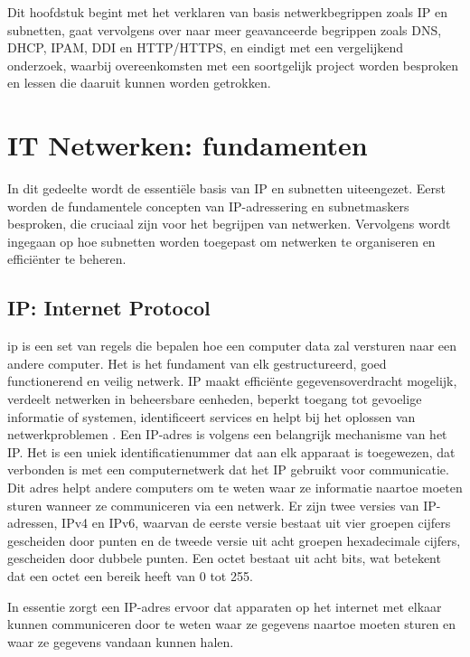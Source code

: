 Dit hoofdstuk begint met het verklaren van basis netwerkbegrippen zoals IP en subnetten, gaat vervolgens over naar meer geavanceerde begrippen zoals DNS, DHCP, IPAM, DDI en HTTP/HTTPS, en eindigt met een vergelijkend onderzoek, waarbij overeenkomsten met een soortgelijk project worden besproken en lessen die daaruit kunnen worden getrokken.


\section{IT Netwerken: fundamenten}
In dit gedeelte wordt de essentiële basis van IP en subnetten uiteengezet. Eerst worden de fundamentele concepten van IP-adressering en subnetmaskers besproken, die cruciaal zijn voor het begrijpen van netwerken. Vervolgens wordt ingegaan op hoe subnetten worden toegepast om netwerken te organiseren en efficiënter te beheren.

\subsection{IP: Internet Protocol}
\acrfull{ip} is een set van regels die bepalen hoe een computer data zal versturen naar een andere computer. Het is het fundament van elk gestructureerd, goed functionerend en veilig netwerk. IP maakt efficiënte gegevensoverdracht mogelijk, verdeelt netwerken in beheersbare eenheden, beperkt toegang tot gevoelige informatie of systemen, identificeert services en helpt bij het oplossen van netwerkproblemen \autocite{Postel1981}. Een IP-adres is volgens \textcite{Postel1981} een belangrijk mechanisme van het IP. Het is een uniek identificatienummer dat aan elk apparaat is toegewezen, dat verbonden is met een computernetwerk dat het IP gebruikt voor communicatie. Dit adres helpt andere computers om te weten waar ze informatie naartoe moeten sturen wanneer ze communiceren via een netwerk.
Er zijn twee versies van IP-adressen, IPv4 en IPv6, waarvan de eerste versie bestaat uit vier groepen cijfers gescheiden door punten en de tweede versie uit acht groepen hexadecimale cijfers, gescheiden door dubbele punten. Een octet bestaat uit acht bits, wat betekent dat een octet een bereik heeft van 0 tot 255.

In essentie zorgt een IP-adres ervoor dat apparaten op het internet met elkaar kunnen communiceren door te weten waar ze gegevens naartoe moeten sturen en waar ze gegevens vandaan kunnen halen.


